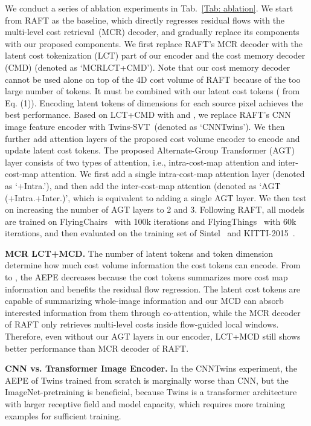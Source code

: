 We conduct a series of ablation experiments in Tab.~\ref{Tab: ablation}.
We start from RAFT as the baseline, which directly regresses residual flows with the multi-level cost retrieval~(MCR) decoder,
and gradually replace its components with our proposed components.
We first replace RAFT's MCR decoder with the latent cost tokenization (LCT) part of our encoder and the cost memory decoder (CMD) (denoted as `MCRLCT+CMD'). Note that our cost memory decoder cannot be used alone on top of the 4D cost volume of RAFT because of the too large number of tokens. It must be combined with our latent cost tokens ( from Eq. (1)). Encoding  latent tokens of  dimensions for each source pixel achieves the best performance.
Based on LCT+CMD with  and , we replace RAFT's CNN image feature encoder with Twins-SVT~(denoted as `CNNTwins').
We then further add attention layers of the proposed cost volume encoder to encode and update latent cost tokens.
The proposed Alternate-Group Transformer (AGT) layer consists of two types of attention, i.e., intra-cost-map attention and inter-cost-map attention.
We first add a single intra-cost-map attention layer (denoted as `+Intra.'), and then add the inter-cost-map attention (denoted as `AGT (+Intra.+Inter.)', which is equivalent to adding a single AGT layer.
We then test on increasing the number of AGT layers to 2 and 3.
Following RAFT, all models are trained on FlyingChairs~\cite{dosovitskiy2015flownet} with 100k iterations and FlyingThings~\cite{mayer2016large} with 60k iterations, and then evaluated on the training set of Sintel~\cite{butler2012naturalistic} and KITTI-2015~\cite{geiger2013vision}.

\noindent \textbf{MCR  LCT+MCD.}
The number of latent tokens  and token dimension  determine how much cost volume information the cost tokens can encode.
From  to , the AEPE decreases because the cost tokens summarizes more cost map information and benefits the residual flow regression.
The latent cost tokens are capable of summarizing whole-image information and our MCD can absorb interested information from them through co-attention, while the MCR decoder of RAFT only retrieves multi-level costs inside flow-guided local windows.
Therefore, even without our AGT layers in our encoder,  LCT+MCD still shows better performance than MCR decoder of RAFT.


\noindent \textbf{CNN vs. Transformer Image Encoder.}
In the CNNTwins experiment, 
the AEPE of Twins trained from scratch is marginally worse than CNN, but the ImageNet-pretraining is beneficial,
because Twins is a transformer architecture with larger receptive field and model capacity, which requires more training examples for sufficient training. 

